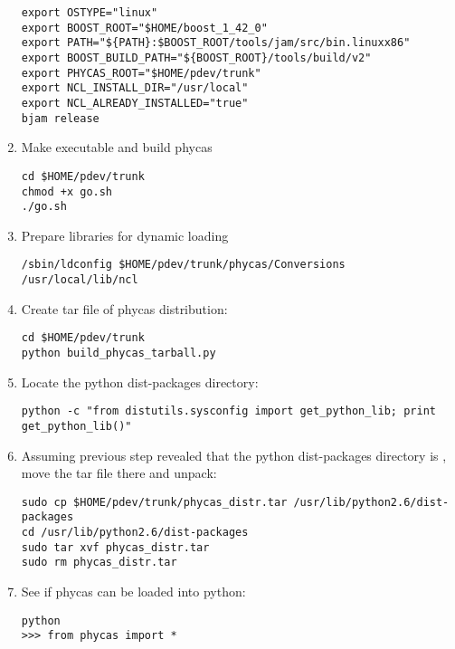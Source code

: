 \begin{enumerate}
\begin{verbatim}
export OSTYPE="linux"
export BOOST_ROOT="$HOME/boost_1_42_0"
export PATH="${PATH}:$BOOST_ROOT/tools/jam/src/bin.linuxx86"
export BOOST_BUILD_PATH="${BOOST_ROOT}/tools/build/v2"
export PHYCAS_ROOT="$HOME/pdev/trunk"
export NCL_INSTALL_DIR="/usr/local"
export NCL_ALREADY_INSTALLED="true"
bjam release
\end{verbatim}
%
\item Make  executable and build phycas
\begin{verbatim}
cd $HOME/pdev/trunk
chmod +x go.sh
./go.sh
\end{verbatim}
%
\item Prepare libraries for dynamic loading
\begin{verbatim}
/sbin/ldconfig $HOME/pdev/trunk/phycas/Conversions /usr/local/lib/ncl
\end{verbatim}
%
\item Create tar file of phycas distribution:
\begin{verbatim}
cd $HOME/pdev/trunk
python build_phycas_tarball.py
\end{verbatim}
%
\item Locate the python dist-packages directory:
\begin{verbatim}
python -c "from distutils.sysconfig import get_python_lib; print get_python_lib()"
\end{verbatim}
%
\item Assuming previous step revealed that the python dist-packages directory is , move the tar file there and unpack:
\begin{verbatim}
sudo cp $HOME/pdev/trunk/phycas_distr.tar /usr/lib/python2.6/dist-packages
cd /usr/lib/python2.6/dist-packages
sudo tar xvf phycas_distr.tar
sudo rm phycas_distr.tar
\end{verbatim}
%
\item See if phycas can be loaded into python:
\begin{verbatim}
python
>>> from phycas import *
\end{verbatim}
\end{enumerate}
